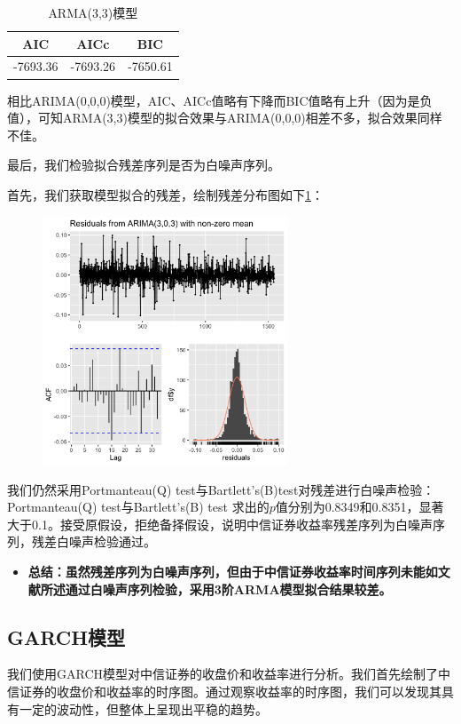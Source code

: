\documentclass[12pt]{article}
\begin{document}
\begin{table}[H]
    \centering
    \caption{ARMA(3,3)模型}
    \label{tab:ARMA}
    \begin{tabular}{ccc}
        \toprule
        AIC & AICc & BIC \\ 
        \midrule
        -7693.36 & -7693.26 & -7650.61\\
        \bottomrule
    \end{tabular}
\end{table}

相比ARIMA(0,0,0)模型，AIC、AICc值略有下降而BIC值略有上升（因为是负值），可知ARMA(3,3)模型的拟合效果与ARIMA(0,0,0)相差不多，拟合效果同样不佳。

最后，我们检验拟合残差序列是否为白噪声序列。

首先，我们获取模型拟合的残差，绘制残差分布图如下\ref{fig:AA}：

\begin{figure}[H]
\centering
\includegraphics[width=0.65\textwidth]{AA.png}
\caption{}
\label{fig:AA}
\end{figure}

我们仍然采用Portmanteau(Q) test与Bartlett's(B)test对残差进行白噪声检验：Portmanteau(Q) test与Bartlett's(B) test 求出的$p$值分别为0.8349和0.8351，显著大于0.1。接受原假设，拒绝备择假设，说明中信证券收益率残差序列为白噪声序列，残差白噪声检验通过。

\begin{itemize}
    \item \textbf{总结：虽然残差序列为白噪声序列，但由于中信证券收益率时间序列未能如文献所述通过白噪声序列检验，采用3阶ARMA模型拟合结果较差。}
\end{itemize}

\subsection{GARCH模型}
我们使用GARCH模型对中信证券的收盘价和收益率进行分析。我们首先绘制了中信证券的收盘价和收益率的时序图。通过观察收益率的时序图，我们可以发现其具有一定的波动性，但整体上呈现出平稳的趋势。
\end{document}
